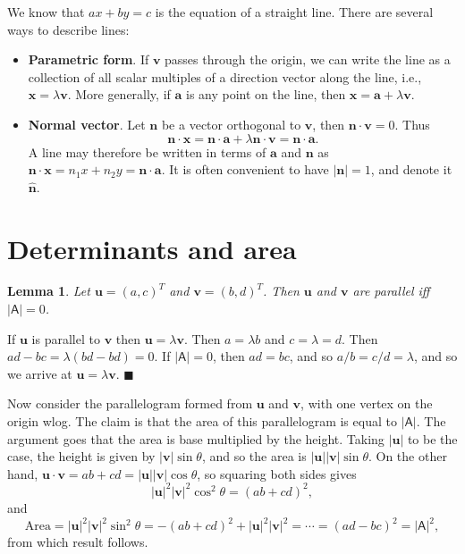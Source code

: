 \documentclass[letter-paper]{tufte-book}
\newtheorem{lemma}[theorem]{\color{pastel-blue}Lemma}
\newenvironment{proof}[1][Proof]{\begin{trivlist}
\item[\hskip \labelsep {\bfseries #1}]}{\end{trivlist}}
\newcommand{\ab}{\boldsymbol{a}}
\newcommand{\nb}{\boldsymbol{n}}
\newcommand{\ub}{\boldsymbol{u}}
\newcommand{\vb}{\boldsymbol{v}}
\newcommand{\xb}{\boldsymbol{x}}
\newcommand\Def[1]{\textbf{#1}}
\newcommand{\qed}{\hfill$\blacksquare$}
\begin{document}
We know that $ax+by=c$ is the equation of a straight line. There are several
ways to describe lines:
\begin{itemize}
	\item \Def{Parametric form}. If $\vb$ passes through the origin, we
	can write the line as a collection of all scalar multiples of a direction
	vector along the line, i.e., $\xb=\lambda\vb$. More generally, if $\ab$ is
	any point on the line, then $\xb=\ab+\lambda\vb$.
	\item \Def{Normal vector}. Let $\nb$ be a vector orthogonal to $\vb$,
	then $\nb\cdot\vb=0$. Thus
	\begin{equation}
		\nb\cdot\xb=\nb\cdot\ab+\lambda\nb\cdot\vb = \nb\cdot\ab.
	\end{equation}
	A line may therefore be written in terms of $\ab$ and $\nb$ as
	$\nb\cdot\xb=n_1 x + n_2 y = \nb\cdot\ab$. It is often convenient to have
	$|\nb|=1$, and denote it $\hat{\nb}$.
\end{itemize}


\section{Determinants and area}

\begin{lemma}
	Let $\ub=(a,c)^{T}$ and $\vb=(b,d)^{T}$. Then $\ub$ and $\vb$ are parallel
	iff $|\mathsf{A}|=0$.
\end{lemma}
\begin{proof}
	If $\ub$ is parallel to $\vb$ then $\ub=\lambda\vb$. Then $a=\lambda b$ and
	$c=\lambda=d$. Then $ad-bc=\lambda(bd-bd)=0$. If $|\mathsf{A}|=0$, then
	$ad=bc$, and so $a/b=c/d=\lambda$, and so we arrive at $\ub=\lambda\vb$. \qed
\end{proof}

Now consider the parallelogram formed from $\ub$ and $\vb$, with one vertex on
the origin wlog. The claim is that the area of this parallelogram is equal to
$|\mathsf{A}|$. The argument goes that the area is base multiplied by the
height. Taking $|\ub|$ to be the case, the height is given by $|\vb|\sin\theta$,
and so the area is $|\ub||\vb|\sin\theta$. On the other hand,
$\ub\cdot\vb=ab+cd=|\ub||\vb|\cos\theta$, so squaring both sides gives
\begin{equation*}
	|\ub|^2 |\vb|^2 \cos^2\theta = (ab+cd)^2,
\end{equation*}
and
\begin{equation*}
	\mbox{Area}=|\ub|^2 |\vb|^2 \sin^2\theta = -(ab+cd)^2 + |\ub|^2 |\vb|^2
	=\cdots=(ad-bc)^2=|\mathsf{A}|^2,
\end{equation*}
from which result follows.
\end{document}
